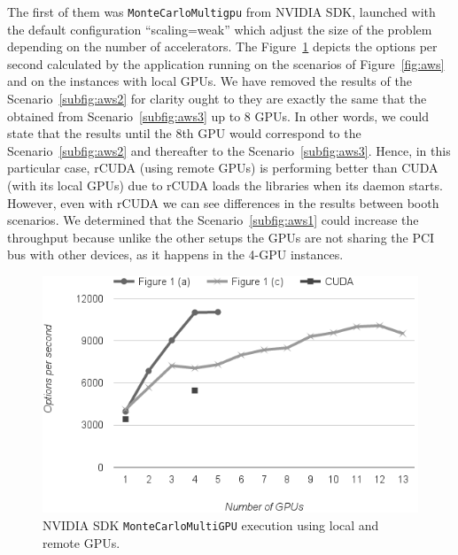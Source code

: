 \documentclass[a4paper,twoside]{article}
\begin{document}
The first of them was {\tt MonteCarloMultigpu} from NVIDIA SDK, launched with the default configuration ``scaling=weak'' which adjust the size of the problem depending on the number of accelerators.
The Figure~\ref{fig:mont-opt} depicts the options per second calculated by the application running on the scenarios of Figure~\ref{fig:aws} and on the instances with local GPUs. 
We have removed the results of the Scenario~\ref{subfig:aws2} for clarity ought to they are exactly the same that the obtained from Scenario~\ref{subfig:aws3} up to 8 GPUs. 
In other words, we could state that the results until the 8th GPU would correspond to the Scenario~\ref{subfig:aws2} and thereafter to the Scenario~\ref{subfig:aws3}.
Hence, in this particular case, rCUDA (using remote GPUs) is performing better than CUDA (with its local GPUs) due to rCUDA loads the libraries when its daemon starts.
However, even with rCUDA we can see differences in the results between booth scenarios. We determined that the Scenario~\ref{subfig:aws1} could increase the throughput because
unlike the other setups the GPUs are not sharing the PCI bus with other devices, as it happens in the 4-GPU instances.
\begin{figure}[htb]
  \centering
  \includegraphics[width=\linewidth]{images/aws-mont1.png}
  \caption{NVIDIA SDK {\tt MonteCarloMultiGPU} execution using local and remote GPUs.}
  \label{fig:mont-opt}
\end{figure}
\end{document}
